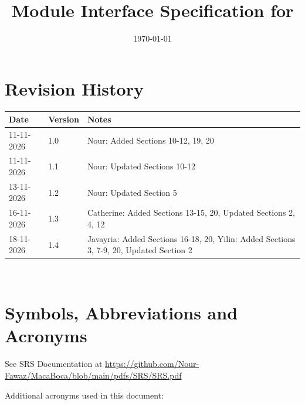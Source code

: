\documentclass[12pt, titlepage]{article}
\begin{document}
\title{Module Interface Specification for \progname{}}

\author{\authname}

\date{\today}

\maketitle


\section{Revision History}

\begin{tabularx}{\textwidth}{p{3cm}p{2cm}X}
\toprule {\bf Date} & {\bf Version} & {\bf Notes}\\
\midrule
11-11-2026 & 1.0 & Nour: Added Sections 10-12, 19, 20\\
11-11-2026 & 1.1 & Nour: Updated Sections 10-12\\
13-11-2026 & 1.2 & Nour: Updated Section 5\\
16-11-2026 & 1.3 & Catherine: Added Sections 13-15, 20, Updated Sections 2, 4, 12\\
18-11-2026 & 1.4 & Javayria: Added Sections 16-18, 20, Yilin: Added Sections 3, 7-9, 20, Updated Section 2\\
\bottomrule
\end{tabularx}

~\newpage

\section{Symbols, Abbreviations and Acronyms}

See SRS Documentation at \url{https://github.com/Nour-Fawaz/MacaBoca/blob/main/pdfs/SRS/SRS.pdf}

\noindent Additional acronyms used in this document:
\end{document}
